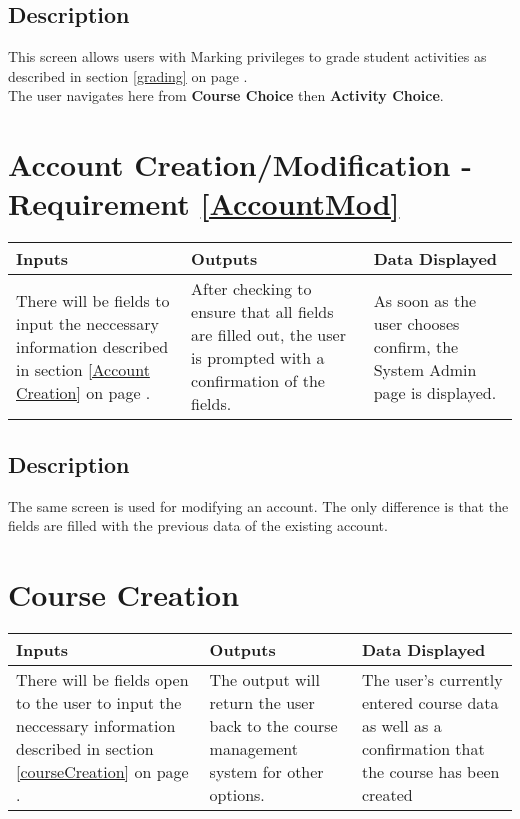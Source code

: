 \documentclass{article}
\begin{document}
\subsection{Description}
This screen allows users with Marking privileges to grade student activities
as described in section \ref{grading} on page \pageref{grading}.\\
The user navigates here from \textbf{Course Choice} then \textbf{Activity Choice}.

\section{Account Creation/Modification  -Requirement \ref{AccountMod}}
\begin{tabular}{| p{5cm} | p{5cm} | p{5cm} |}
	\hline
	Inputs & Outputs & Data Displayed \\ \hline
	There will be fields to input the neccessary information described
in section \ref{Account Creation} on page \pageref{Account Creation}.
	& After checking to ensure that all fields are filled out, the user is 
	prompted with a confirmation of the fields. 
	& As soon as the user chooses confirm, the System Admin page is displayed.
	
	\\ \hline
\end{tabular}

\subsection{Description}
The same screen is used for modifying an account. The only difference is
that the fields are filled with the previous data of the existing account.

\section{Course Creation}
\begin{tabular}{| p{5cm} | p{5cm} | p{5cm} |}
	\hline
	Inputs & Outputs & Data Displayed \\ \hline
	There will be fields open to the user to input the neccessary information described
in section \ref{courseCreation} on page \pageref{courseCreation}.
	& The output will return
the user back to the course management system for other options.
	& The user's currently entered course data as well as a confirmation that the course
	has been created
	\\ \hline
\end{tabular}
\end{document}

